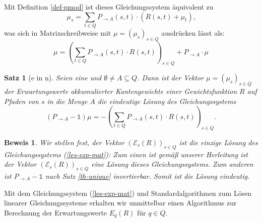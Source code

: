 \documentclass[a4paper]{article}
\newtheorem{satz}{Satz}[section] %
\theoremstyle{nonumberplain}
\newtheorem{beweis}{Beweis}
\begin{document}
Mit Definition \ref{def-pmod} ist dieses Gleichungssystem äquivalent zu
\begin{equation}
	\mu_s = \sum_{t \in Q}{ P_{\rightarrow A}(s,t) \cdot \left(R(s,t) + \mu_{t} \right) }\text{,}
\end{equation}
was sich in Matrixschreibweise mit $\mu = (\mu_s)_{s \in Q }$ ausdrücken lässt als:
\begin{equation}
\mu = \left(\sum_{t \in Q}{ P_{\rightarrow A}(s,t) \cdot R(s,t) }\right)_{s \in Q} + P_{\rightarrow A} \cdot \mu 
\end{equation}
\begin{satz}[\expect{}e in \mc{}n]\label{th-exp}
	Seien \mcex{} eine \mc{} und $\emptyset \neq A\subseteq Q$. Dann ist der Vektor $\mu = (\mu_s)_{s \in Q }$ der Erwartungswerte akkumulierter Kantengewichte einer Gewichtsfunktion $R$ auf Pfaden von $s$ in die Menge $A$ die eindeutige Lösung des Gleichungssystems	
	 \begin{equation}
	 (P_{\rightarrow A} - \mathbb{1}) \mu = - \left(\sum_{t \in Q}{ P_{\rightarrow A}(s,t) \cdot R(s,t) }\right)_{s \in Q}\text{.}\label{les-exp-mat}
	 \end{equation}
\end{satz}
\begin{beweis}
Wir stellen fest, der Vektor $(\mathcal{E}_{s}(R))_{s \in Q}$ ist die einzige Lösung des Gleichungssystems (\ref{les-exp-mat}):
Zum einen ist gemäß unserer Herleitung ist der Vektor $(\mathcal{E}_{s}(R))_{s \in Q}$ eine Lösung dieses Gleichungssystems. Zum anderen ist $P_{\rightarrow A} - \mathbb{1}$ nach Satz \ref{th-unique} invertierbar. Somit ist die Lösung eindeutig.
\end{beweis}

Mit dem Gleichungssystem (\ref{les-exp-mat}) und Standardalgorithmen zum Lösen linearer Gleichungssysteme erhalten wir unmittelbar einen Algorithmus zur Berechnung der Erwartungswerte $E_q(R)$ für $q \in Q$.
\end{document}

